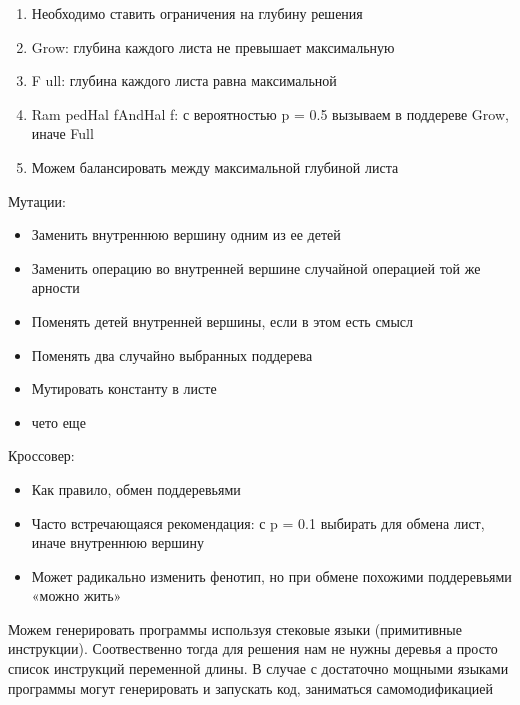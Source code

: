 \begin{enumerate} 
	\item Необходимо ставить ограничения на глубину решения 
	\item Grow: глубина каждого листа не превышает максимальную
	\item F ull: глубина каждого листа равна максимальной
	\item Ram pedHal fAndHal f: с вероятностью p = 0.5 вызываем в поддереве Grow, иначе Full
	\item Можем балансировать между максимальной глубиной листа
\end{enumerate} 
Мутации:
\begin{itemize}
Заменить поддерево случайно сгенерированным деревом
	\item Заменить внутреннюю вершину одним из ее детей
	\item Заменить операцию во внутренней вершине случайной операцией той же арности
	\item Поменять детей внутренней вершины, если в этом есть смысл
	\item Поменять два случайно выбранных поддерева
	\item Мутировать константу в листе
	\item чето еще
\end{itemize}
Кроссовер:
\begin{itemize}
	\item Как правило, обмен поддеревьями
	\item Часто встречающаяся рекомендация: с p = 0.1 выбирать для обмена лист, иначе внутреннюю вершину
	\item Может радикально изменить фенотип, но при обмене похожими поддеревьями «можно жить»
\end{itemize}
Можем генерировать программы используя стековые языки (примитивные инструкции). 
Соотвественно тогда для решения нам не нужны деревья а просто список инструкций переменной длины. 
В случае с достаточно мощными языками программы могут генерировать и запускать код, заниматься самомодификацией
